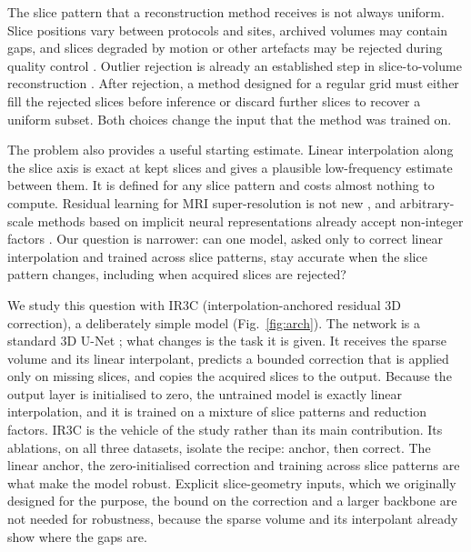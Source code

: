 \documentclass[a4paper,fleqn]{cas-dc}
\begin{document}
The slice pattern that a reconstruction method receives is not always uniform. Slice
positions vary between protocols and sites, archived volumes may contain gaps, and slices
degraded by motion or other artefacts may be rejected during quality control
\citep{zaitsev2015motion}. Outlier rejection is already an established step in
slice-to-volume reconstruction \citep{kuklisova2012outlier,kainz2015svr}. After rejection,
a method designed for a regular grid must either fill the rejected slices before inference
or discard further slices to recover a uniform subset. Both choices change the input that
the method was trained on.

The problem also provides a useful starting estimate. Linear interpolation along the slice
axis is exact at kept slices and gives a plausible low-frequency estimate between them. It
is defined for any slice pattern and costs almost nothing to compute. Residual learning for
MRI super-resolution is not new \citep{chaudhari2018deepresolve,peng2020saint}, and
arbitrary-scale methods based on implicit neural representations already accept
non-integer factors \citep{wu2023arssr,wang2024sainr}. Our question is narrower: can one
model, asked only to correct linear interpolation and trained across slice patterns, stay
accurate when the slice pattern changes, including when acquired slices
are rejected?

We study this question with IR3C (interpolation-anchored residual 3D correction), a
deliberately simple model (Fig.~\ref{fig:arch}). The network is a standard 3D U-Net
\citep{ronneberger2015unet}; what changes is the task it is given. It receives the sparse
volume and its linear interpolant, predicts a bounded correction that is applied only on
missing slices, and copies the acquired slices to the output. Because the output layer is
initialised to zero, the untrained model is exactly linear interpolation, and it is trained
on a mixture of slice patterns and reduction factors. IR3C is the vehicle of the study
rather than its main contribution. Its ablations, on all three datasets, isolate the
recipe: anchor, then correct. The linear anchor, the zero-initialised correction and
training across slice patterns are what make the model robust. Explicit slice-geometry
inputs, which we originally designed for the purpose, the bound on the correction and a
larger backbone are not needed for robustness, because the sparse volume and its
interpolant already show where the gaps are.
\end{document}
